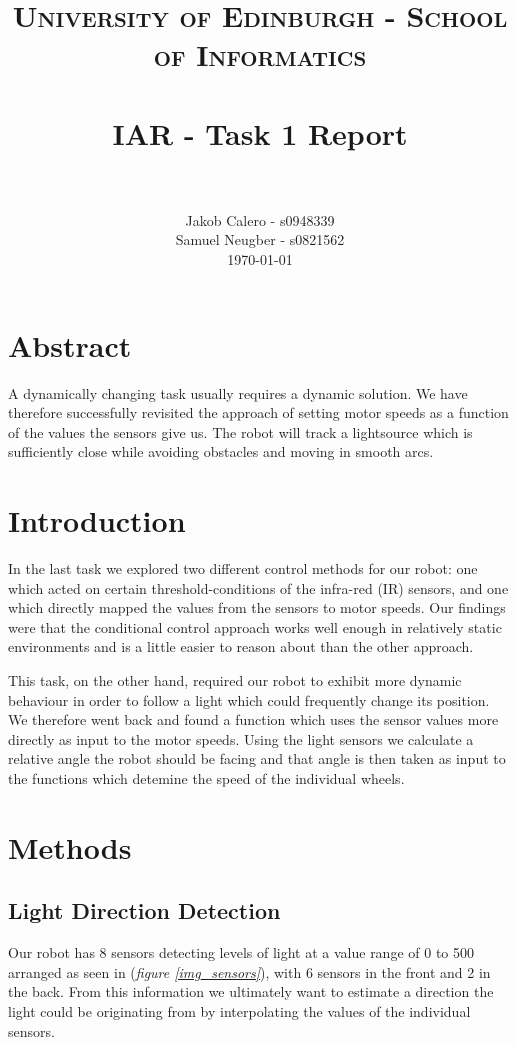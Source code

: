 \documentclass[paper=a4, fontsize=12pt]{scrartcl}	%
\title{
\vspace{-1in} 	
\usefont{OT1}{bch}{b}{n}
\normalfont \normalsize \textsc{University of Edinburgh - School of Informatics}
\\ [25pt]
\horrule{0.5pt} \\[0.4cm]
\large IAR - Task 1 Report \\
\horrule{1pt} \\[0.5cm]
}
\author{
  \normalfont \normalsize
  Jakob Calero - s0948339\\[-3pt]\normalsize
  Samuel Neugber - s0821562\\[-3pt]\normalsize
  \today
}
\date{}
\numberwithin{equation}{section}		%
\numberwithin{figure}{section}			%
\numberwithin{table}{section}				%
\begin{document}
\maketitle					%
\section{Abstract}
A dynamically changing task usually requires a dynamic solution. We have therefore successfully revisited the approach of setting motor speeds as a function of the values the sensors give us. The robot will track a lightsource which is sufficiently close while avoiding obstacles and moving in smooth arcs.


\section{Introduction}
In the last task we explored two different control methods for our robot: one which acted on certain threshold-conditions of the infra-red (IR) sensors, and one which directly mapped the values from the sensors to motor speeds. Our findings were that the conditional control approach works well enough in relatively static environments and is a little easier to reason about than the other approach.

This task, on the other hand, required our robot to exhibit more dynamic behaviour in order to follow a light which could frequently change its position. We therefore went back and found a function which uses the sensor values more directly as input to the motor speeds. Using the light sensors we calculate a relative angle the robot should be facing and that angle is then taken as input to the functions which detemine the speed of the individual wheels.

\section{Methods} 
\subsection{Light Direction Detection}
\label{LDD}
Our robot has 8 sensors detecting levels of light at a value range of 0 to 500 arranged as seen in (\emph{figure \ref{img_sensors}}), with 6 sensors in the front and 2 in the back. From this information we ultimately want to estimate a direction the light could be originating from by interpolating the values of the individual sensors.
\end{document}
